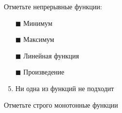 Отметьте непрерывные функции:
\begin{enumerate}[label=$\square$]	%
	\item[$\blacksquare$] Минимум
	\item[$\blacksquare$] Максимум
	\item[$\blacksquare$] Линейная функция
	\item[$\blacksquare$] Произведение
	\item Ни одна из функций не подходит
\end{enumerate}

\task
Отметьте строго монотонные функции
\begin{enumerate}[label=$\square$]
	
	
	
	
	

\end{enumerate}
